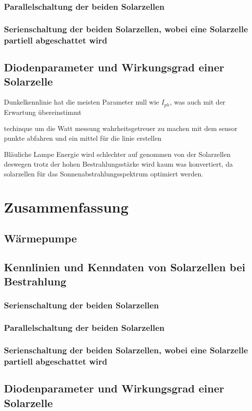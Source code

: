 \documentclass[12pt,english,ngerman]{scrartcl}
\begin{document}
\subsubsection{Parallelschaltung der beiden Solarzellen}

\subsubsection{Serienschaltung der beiden Solarzellen, wobei eine Solarzelle partiell abgeschattet wird}

\subsection{Diodenparameter und Wirkungsgrad einer Solarzelle}

Dunkelkennlinie hat die meisten Parameter null wie $I_{ph}$, was auch mit der
Erwartung übereinstimmt

techinque um die Watt messung wahrheitsgetreuer zu machen mit dem sensor punkte
abfahren und ein mittel für die linie erstellen

Bläuliche Lampe Energie wird schlechter auf genommen von der Solarzellen
deswegen trotz der hohen Bestrahlungsstärke wird kaum was konvertiert, da
solarzellen für das Sonnenabstrahlungsspektrum optimiert werden.

\section{Zusammenfassung}\label{sec:zusammenfassung}

\subsection{Wärmepumpe}

\subsection{Kennlinien und Kenndaten von Solarzellen bei Bestrahlung}

\subsubsection{Serienschaltung der beiden Solarzellen}

\subsubsection{Parallelschaltung der beiden Solarzellen}

\subsubsection{Serienschaltung der beiden Solarzellen, wobei eine Solarzelle partiell abgeschattet wird}

\subsection{Diodenparameter und Wirkungsgrad einer Solarzelle}

\newpage
\printbibliography
\listoffigures
\listoftables
\end{document}
